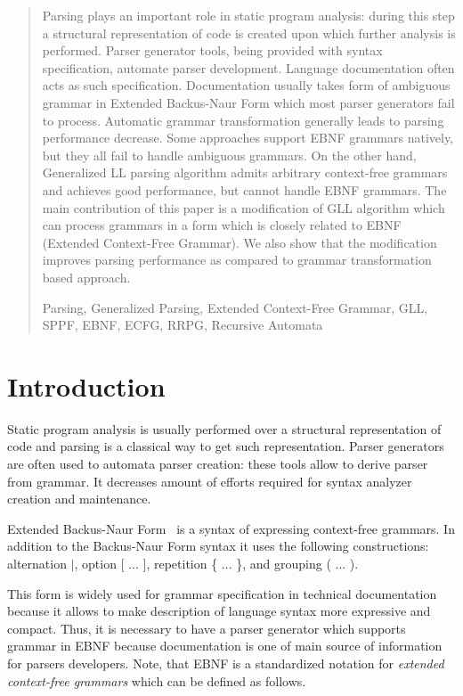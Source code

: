 \documentclass[runningheads,a4paper]{llncs}
\newcommand{\keywords}[1]{\par\addvspace\baselineskip
\noindent\keywordname\enspace\ignorespaces#1}
\begin{document}
\begin{abstract}
Parsing plays an important role in static program analysis: during this step a structural representation of code is created upon which further analysis is performed. 
Parser generator tools, being provided with syntax specification, automate parser development. 
Language documentation often acts as such specification. 
Documentation usually takes form of ambiguous grammar in Extended Backus-Naur Form which most parser generators fail to process. 
Automatic grammar transformation generally leads to parsing performance decrease. 
Some approaches support EBNF grammars natively, but they all fail to handle ambiguous grammars. 
On the other hand, Generalized LL parsing algorithm admits arbitrary context-free grammars and achieves good performance, but cannot handle EBNF grammars. 
The main contribution of this paper is a modification of GLL algorithm which can process grammars in a form which is closely related to EBNF (Extended Context-Free Grammar). 
We also show that the modification improves parsing performance as compared to grammar transformation based approach. 

\keywords{Parsing, Generalized Parsing, Extended Context-Free Grammar, GLL, SPPF, EBNF, ECFG, RRPG, Recursive Automata}
\end{abstract}


\section{Introduction}%

Static program analysis is usually performed over a structural representation of code and parsing is a classical way to get such representation.
Parser generators are often used to automata parser creation: these tools allow to derive parser from grammar.
It decreases amount of efforts required for syntax analyzer creation and maintenance.

Extended Backus-Naur Form~\cite{EBNFISO} is a syntax of expressing context-free grammars. 
In addition to the Backus-Naur Form syntax it uses the following constructions: alternation $\mid$, option [ ... ], repetition \{ ... \}, and grouping ( ... ).

This form is widely used for grammar specification in technical documentation because it allows to make description of language syntax more expressive and compact. 
Thus, it is necessary to have a parser generator which supports grammar in EBNF because documentation is one of main source of information for parsers developers.
Note, that EBNF is a standardized notation for \textit{extended context-free grammars} which can be defined as follows.
\end{document}
